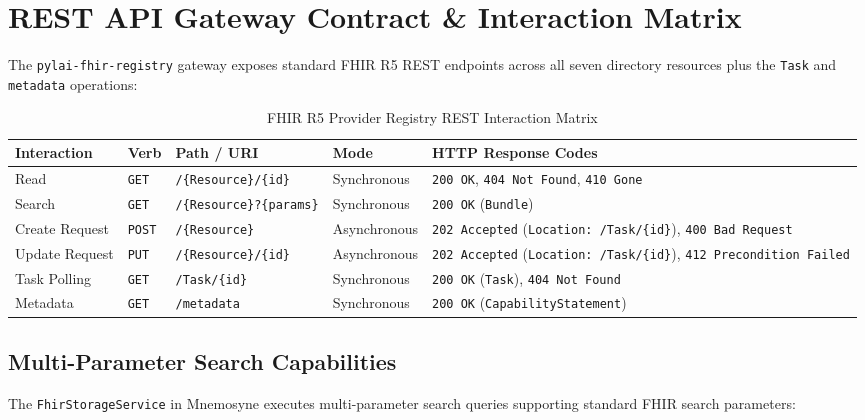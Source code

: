 \section{REST API Gateway Contract \& Interaction Matrix}
\label{sec:pr_api_contract}

The \texttt{pylai-fhir-registry} gateway exposes standard FHIR R5 REST endpoints across all seven directory resources plus the \texttt{Task} and \texttt{metadata} operations:

\begin{table}[htbp]
\centering
\small
\begin{tabularx}{\textwidth}{l l p{3.5cm} l X}
\toprule
\textbf{Interaction} & \textbf{Verb} & \textbf{Path / URI} & \textbf{Mode} & \textbf{HTTP Response Codes} \\
\midrule
Read & \texttt{GET} & \texttt{/\{Resource\}/\{id\}} & Synchronous & \texttt{200 OK}, \texttt{404 Not Found}, \texttt{410 Gone} \\
Search & \texttt{GET} & \texttt{/\{Resource\}?\{params\}} & Synchronous & \texttt{200 OK} (\texttt{Bundle}) \\
Create Request & \texttt{POST} & \texttt{/\{Resource\}} & Asynchronous & \texttt{202 Accepted} (\texttt{Location: /Task/\{id\}}), \texttt{400 Bad Request} \\
Update Request & \texttt{PUT} & \texttt{/\{Resource\}/\{id\}} & Asynchronous & \texttt{202 Accepted} (\texttt{Location: /Task/\{id\}}), \texttt{412 Precondition Failed} \\
Task Polling & \texttt{GET} & \texttt{/Task/\{id\}} & Synchronous & \texttt{200 OK} (\texttt{Task}), \texttt{404 Not Found} \\
Metadata & \texttt{GET} & \texttt{/metadata} & Synchronous & \texttt{200 OK} (\texttt{CapabilityStatement}) \\
\bottomrule
\end{tabularx}
\caption{FHIR R5 Provider Registry REST Interaction Matrix}
\label{tab:pr_interaction_matrix}
\end{table}

\subsection{Multi-Parameter Search Capabilities}
The \texttt{FhirStorageService} in Mnemosyne executes multi-parameter search queries supporting standard FHIR search parameters:


